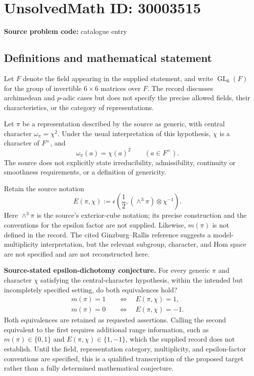 \documentclass[11pt]{article}
\begin{document}
\section*{UnsolvedMath ID: 30003515}
\textbf{Source problem code:} catalogue entry
\subsection{Definitions and mathematical statement}
Let \(F\) denote the field appearing in the supplied statement, and write \(\operatorname{GL}_6(F)\) for the group of invertible \(6\times6\) matrices over \(F\). The record discusses archimedean and \(p\)-adic cases but does not specify the precise allowed fields, their characteristics, or the category of representations.

Let \(\pi\) be a representation described by the source as generic, with central character \(\omega_\pi=\chi^2\). Under the usual interpretation of this hypothesis, \(\chi\) is a character of \(F^\times\), and
\[
\omega_\pi(a)=\chi(a)^2\qquad(a\in F^\times).
\]
The source does not explicitly state irreducibility, admissibility, continuity or smoothness requirements, or a definition of genericity.

Retain the source notation
\[
E(\pi,\chi):=\epsilon\!\left(\frac12,(\wedge^3\pi)\otimes\chi^{-1}\right).
\]
Here \(\wedge^3\pi\) is the source's exterior-cube notation; its precise construction and the conventions for the epsilon factor are not supplied. Likewise, \(m(\pi)\) is not defined in the record. The cited Ginzburg--Rallis reference suggests a model-multiplicity interpretation, but the relevant subgroup, character, and Hom space are not specified and are not reconstructed here.

\textbf{Source-stated epsilon-dichotomy conjecture.} For every generic \(\pi\) and character \(\chi\) satisfying the central-character hypothesis, within the intended but incompletely specified setting, do both equivalences hold?
\[
\begin{aligned}
m(\pi)=1&\quad\Longleftrightarrow\quad E(\pi,\chi)=1,\\
m(\pi)=0&\quad\Longleftrightarrow\quad E(\pi,\chi)=-1.
\end{aligned}
\]
Both equivalences are retained as requested assertions. Calling the second equivalent to the first requires additional range information, such as \(m(\pi)\in\{0,1\}\) and \(E(\pi,\chi)\in\{1,-1\}\), which the supplied record does not establish. Until the field, representation category, multiplicity, and epsilon-factor conventions are specified, this is a qualified transcription of the proposed target rather than a fully determined mathematical conjecture.
\end{document}
